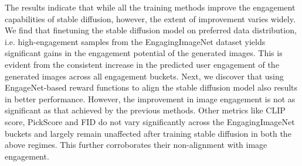 
 
 
 The results indicate that while all the training methods improve the engagement capabilities of stable diffusion, however, the extent of improvement varies widely. We find that finetuning the stable diffusion model on preferred data distribution, i.e. high-engagement samples from the EngagingImageNet dataset yields significant gains in the engagement potential of the generated images. This is evident from the consistent increase in the predicted user engagement of the generated images across all engagement buckets. %
 Next, we discover that using EngageNet-based reward functions to align the stable diffusion model also results in better performance. %
 However, the improvement in image engagement is not as significant as that achieved by the previous methods. 
 Other metrics like CLIP score, PickScore and FID do not vary significantly across the EngagingImageNet buckets and largely remain unaffected after training stable diffusion in both the above regimes. This further corroborates their non-alignment with image engagement. 

 
 
 
 
 
